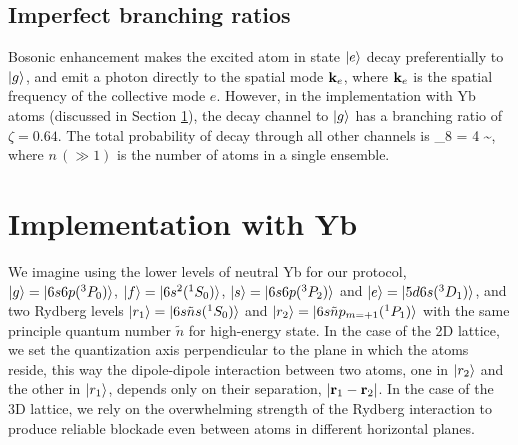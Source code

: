 
\subsection{Imperfect branching ratios}
Bosonic enhancement makes the excited atom in state $| e \rangle$ decay
preferentially to $| g \rangle$, and emit a photon directly to the spatial mode
${\mathbf k}_e$, where ${\mathbf k}_e$ is the spatial frequency of the collective mode $e$.
However, in the implementation with Yb atoms (discussed in Section
\ref{sec:Implementation}), the decay channel to $| g \rangle$ has a branching ratio
of $\zeta = 0.64$. The total probability of decay through all other channels is
\bel
\label{eq:f8}
	\eps_8 = 4   \sim {},
\eel
where $n\,(\gg 1)$ is the number of atoms in a single ensemble.



\section{Implementation with Yb}
\label{sec:Implementation}
We imagine using the lower levels of neutral Yb for our protocol,  $| g \rangle =
| 6s6p({}^3P_0) \rangle$, $| f \rangle = | 6s^2({}^1S_0) \rangle$, $| s \rangle =
| 6s6p({}^3P_2) \rangle$ and $| e \rangle = | 5d6s({}^3D_1) \rangle$, and two Rydberg
levels $| r_1 \rangle = | 6s\tilde n s({}^1S_0) \rangle$ and $| r_2 \rangle =
| 6s\tilde n p_{m=+1}({}^1P_1) \rangle$ with the same principle
quantum number $\tilde n$ for high-energy state. In the case of the 2D
lattice, we set the quantization axis perpendicular to the plane in which the
atoms reside, this way the dipole-dipole interaction between two atoms, one in $| r_2 \rangle$ and the other in $| r_1 \rangle$,
depends only on their separation, $|{\mathbf r}_1 - {\mathbf r}_2|$. In the case of the 3D
lattice, we rely on the overwhelming strength of the Rydberg interaction to
produce reliable blockade even between atoms in different horizontal planes.

